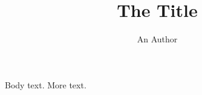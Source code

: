 \documentclass{zzfmg}
\title{The Title}\author{An Author}
\begin{document}
\maketitle
Body text.
\newpage
More text.
\end{document}
